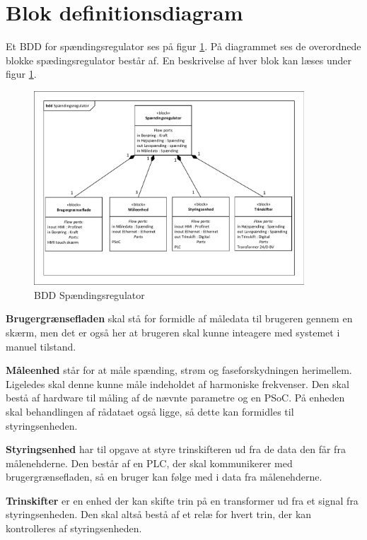 
\section{Blok definitionsdiagram}
Et BDD for spændingsregulator ses på figur \ref{fig:BDDSpaendingsregulator}. På diagrammet ses de overordnede blokke spædingsregulator består af. En beskrivelse af hver blok kan læses under figur \ref{fig:BDDSpaendingsregulator}.

\begin{figure}[htbp] %
	\centering
	\includegraphics[width=0.9\textwidth]{Figure/BDDSpaendingsregulator}
	\caption{BDD Spændingsregulator}
	\label{fig:BDDSpaendingsregulator}
\end{figure}

\textbf{Brugergrænsefladen} skal stå for formidle af måledata til brugeren gennem en skærm, men det er også her at brugeren skal kunne inteagere med systemet i manuel tilstand.

\textbf{Måleenhed} står for at måle spænding, strøm og faseforskydningen herimellem. Ligeledes skal denne kunne måle indeholdet af harmoniske frekvenser. Den skal bestå af hardware til måling af de nævnte parametre og en PSoC. På enheden skal behandlingen af rådataet også ligge, så dette kan formidles til styringsenheden.

\textbf{Styringsenhed} har til opgave at styre trinskifteren ud fra de data den får fra målenehderne. Den består af en PLC, der skal kommunikerer med brugergrænsefladen, så en bruger kan følge med i data fra målenehderne.

\textbf{Trinskifter} er en enhed der kan skifte trin på en transformer ud fra et signal fra styringsenheden. Den skal altså bestå af et relæ for hvert trin, der kan kontrolleres af styringsenheden.